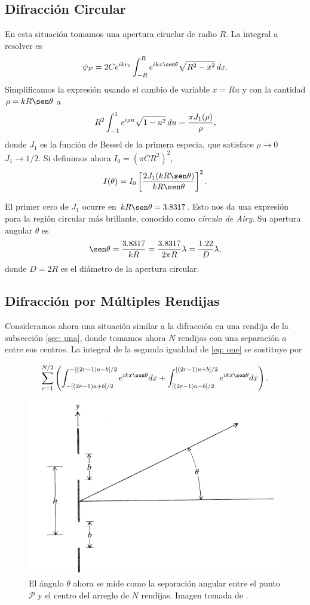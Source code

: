\begin{multicols}{2}
\subsection{Difracción Circular}
En esta situación tomamos una apertura ciruclar de radio $R$. La integral a resolver es
\begin{equation}
	\psi_\mathcal{P} = 2C\eto{ikr_0} \int_{-R}^R \eto{ik x \sen \theta} \sqrt{R^2 - x^2} \, dx.
\end{equation}
Simplificamos la expresión usando el cambio de variable $x = Ru$ y con la cantidad $\rho = kR \sen \theta$ a
\begin{equation}
	R^2\int_{-1}^1 e^{i\rho u}\sqrt{1 - u^2} \, du = \frac{\pi J_1(\rho)}{\rho},
\end{equation}
donde $J_1$ es la función de Bessel de la primera especia, que satisface $\rho \to 0$ $J_1 \to 1/2$. Si definimos ahora $I_0 = (\pi CR^2)^2$,
\begin{equation}\label{eq: circular}
	I(\theta) = I_0 \left[\frac{2J_1(kR \sen \theta)}{kR \sen \theta} \right]^2.
\end{equation}

El primer cero de $J_1$ ocurre en $kR \sen \theta = 3.8317$. Esto nos da una expresión para la región circular más brillante, conocido como \emph{círculo de Airy}. Su apertura angular $\theta$ es
\begin{equation}\label{eq: airy}
	\sen \theta = \frac{3.8317}{kR} = \frac{3.8317}{2\pi R}\lambda = \frac{1.22}{D}\lambda,
\end{equation}
donde $D = 2R$ es el diámetro de la apertura circular.

\subsection{Difracción por Múltiples Rendijas}
Consideramos ahora una situación similar a la difracción en una rendija de la subsección \ref{sec: una}, donde tomamos ahora $N$ rendijas con una separación $a$ entre sus centros. 
La integral de la segunda igualdad de \eqref{eq: one} se sustituye por
\end{multicols}
\begin{equation}\label{eq: massive}
	\sum_{r=1}^{N/2} \left( \int_{-[(2r-1)a + b]/2}^{-[(2r-1)a - b]/2} \eto{ik x \sen \theta} dx + \int_{[(2r-1)a - b]/2}^{[(2r-1)a + b]/2} \eto{ik x \sen \theta} dx
	\right).
\end{equation}
\begin{figure}[H]
	\centering
	\includegraphics[width=.4\linewidth]{Imagenes/DS}
	\caption{El ángulo $\theta$ ahora se mide como la separación angular entre el punto $\mathcal P$ y el centro del arreglo de $N$ rendijas. Imagen tomada de \parencite{fowles-1989}.}
	\label{fig: DS}
\end{figure}


